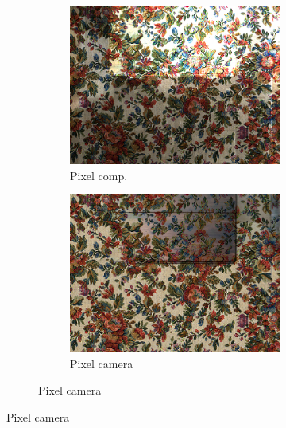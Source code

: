 \begin{figure}[]
\begin{subfigure}{\textwidth}
\begin{subfigure}{0.24\textwidth}
            \includegraphics[width=\textwidth]{images/04-experiment02/carpet/flowers/pixel_im.jpg}
            \caption*{Pixel comp.}
        \end{subfigure}
        \hfill
        \begin{subfigure}{0.24\textwidth}
            \centering
            \includegraphics[width=\textwidth]{images/04-experiment02/carpet/flowers/pixel_proj.jpg}
            \caption*{Pixel camera}
        \end{subfigure}
    \end{subfigure}


\end{figure}
